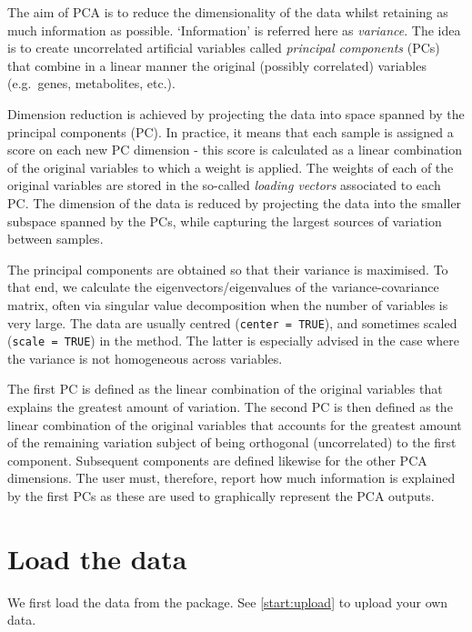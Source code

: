 \documentclass[]{book}
\newenvironment{Shaded}{\begin{snugshade}}{\end{snugshade}}
\newcommand{\KeywordTok}[1]{\textcolor[rgb]{0.13,0.29,0.53}{\textbf{#1}}}
\newcommand{\NormalTok}[1]{#1}
\newcommand{\OperatorTok}[1]{\textcolor[rgb]{0.81,0.36,0.00}{\textbf{#1}}}
\newcommand{\StringTok}[1]{\textcolor[rgb]{0.31,0.60,0.02}{#1}}
\begin{document}
The aim of PCA \citep{Jol05} is to reduce the dimensionality of the data whilst retaining as much information as possible. `Information' is referred here as \emph{variance}. The idea is to create uncorrelated artificial variables called \emph{principal components} (PCs) that combine in a linear manner the original (possibly correlated) variables (e.g.~genes, metabolites, etc.).

Dimension reduction is achieved by projecting the data into space spanned by the principal components (PC). In practice, it means that each sample is assigned a score on each new PC dimension - this score is calculated as a linear combination of the original variables to which a weight is applied. The weights of each of the original variables are stored in the so-called \emph{loading vectors} associated to each PC. The dimension of the data is reduced by projecting the data into the smaller subspace spanned by the PCs, while capturing the largest sources of variation between samples.

The principal components are obtained so that their variance is maximised. To that end, we calculate the eigenvectors/eigenvalues of the variance-covariance matrix, often via singular value decomposition when the number of variables is very large. The data are usually centred (\texttt{center\ =\ TRUE}), and sometimes scaled (\texttt{scale\ =\ TRUE}) in the method. The latter is especially advised in the case where the variance is not homogeneous across variables.

The first PC is defined as the linear combination of the original variables that explains the greatest amount of variation. The second PC is then defined as the linear combination of the original variables that accounts for the greatest amount of the remaining variation subject of being orthogonal (uncorrelated) to the first component. Subsequent components are defined likewise for the other PCA dimensions. The user must, therefore, report how much information is explained by the first PCs as these are used to graphically represent the PCA outputs.

\hypertarget{load-the-data}{%
\section{Load the data}\label{load-the-data}}

We first load the data from the package. See \ref{start:upload} to upload your own data.

\begin{Shaded}
\end{Shaded}
\end{document}
